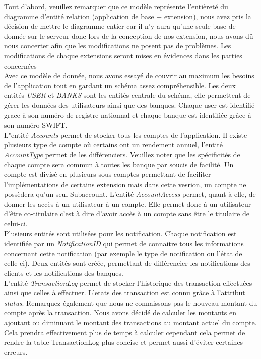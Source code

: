 Tout d'abord, veuillez remarquer que ce modèle représente l'entièreté du diagramme d'entité relation (application de base + extension), nous avez pris la décision de mettre le diagramme entier car 
il n'y aura qu'une seule base de donnée sur le serveur donc lors de la conception de nos extension, nous avons dû nous concerter afin que les modifications ne posent pas de problèmes. 
Les modifications de chaque extensions seront mises en évidences dans les parties concernées\\

Avec ce modèle de donnée, nous avons essayé de couvrir au maximum les besoins de l'application tout en gardant un schéma assez compréhensible.
Les deux entités \textit{USER} et \textit{BANKS} sont les entités centrale du schéma, elle permettent de gérer les données des utilisateurs ainsi que des banques.
Chaque user est identifié grace à son numéro de registre nationnal et chaque banque est identifiée grâce à son numéro SWIFT.\\
L"entité \textit{Accounts} permet de stocker tous les comptes de l'application. Il existe plusieurs type de compte où certains ont un rendement annuel, l'entité \textit{AccountType} permet de les différenciers.
Veuillez noter que les spécificités de chaque compte sera commun à toutes les banque par soucis de facilité.
Un compte est divisé en plusieurs sous-comptes permettant de faciliter l'implémentations de certains extension mais dans cette vesrion, un compte ne possèdera qu'un seul Subaccount.
L'entité \textit{AccountAccess} permet, quant à elle, de donner les accès à un utilisateur à un compte. Elle permet donc à un utilisateur d'être co-titulaire c'est à dire d'avoir accès à un compte sans être le titulaire de celui-ci.\\
Plusieurs entités sont utilisées pour les notification. Chaque notification est identifiée par un \textit{NotificationID} 
qui permet de connaitre tous les informations concernant cette notification (par exemple le type de notification ou l'état de celle-ci).
Deux entités sont créée, permettant de différencier les notifications des clients et les notifications des banques.\\
L'entité \textit{TransactionLog} permet de stocker l'historique des transaction effectuées ainsi que celles à effectuer. L'etats des transaction est connu grâce à l'attribut \textit{status}.
Remarquez également que nous ne connaissons pas le nouveau montant du compte après la transaction. Nous avons décidé de calculer les montants en ajoutant ou diminuant le montant des transactions au montant actuel du compte.
Cela prendra effectivement plus de temps à calculer cependant cela permet de rendre la table TransactionLog plus concise et permet aussi d'éviter certaines erreurs.
